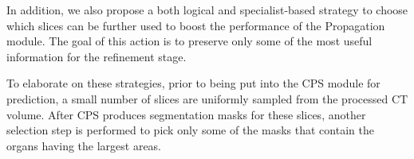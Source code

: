 


In addition, we also propose a both logical and specialist-based strategy to choose which slices can be further used to boost the performance of the Propagation module. The goal of this action is to preserve only some of the most useful information for the refinement stage.

To elaborate on these strategies, prior to being put into the CPS module for prediction, a small number of slices are uniformly sampled from the processed CT volume. After CPS produces segmentation masks for these slices, another selection step is performed to pick only some of the masks that contain the organs having the largest areas.  